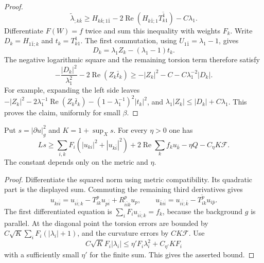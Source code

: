 \begin{proof}
\[
 \widetilde\lambda_{;k\bar k}\geq
 H_{k\bar k;1\bar1}
 -2\operatorname{Re}(H_{k\bar1;1}\overline{T^1_{k1}})-C\lambda_1.
\]
Differentiate $F(W)=f$ twice and sum this inequality with weights $F_k$. Write $D_k=H_{1\bar1;k}$ and $t_k=T^1_{k1}$. The first commutation, using $U_{1\bar1}=\lambda_1-1$, gives
\[
 D_k=\lambda_1Z_k-(\lambda_1-1)t_k.
\]
The negative logarithmic square and the remaining torsion term therefore satisfy
\[
 -\frac{|D_k|^2}{\lambda_1^2}-2\operatorname{Re}(Z_k\bar t_k)
 \geq-|Z_k|^2-C-C\lambda_1^{-2}|D_k|.
\]
For example, expanding the left side leaves $-|Z_k|^2-2\lambda_1^{-1}\operatorname{Re}(Z_k\bar t_k)-(1-\lambda_1^{-1})^2|t_k|^2$, and $\lambda_1|Z_k|\leq|D_k|+C\lambda_1$. This proves the claim, uniformly for small $\beta$.
\end{proof}

\begin{lemma}\label{draft:600-hermitian-gradient-commutation}
Put $s=|\partial u|_g^2$ and $K=1+\sup_Xs$. For every $\eta>0$ one has
\[
 Ls\geq\sum_{i,k}F_i(|u_{ki}|^2+|u_{k\bar i}|^2)
 +2\operatorname{Re}\sum_k f_k u_{\bar k}-\eta Q-C_\eta K\mathcal F.
\]
The constant depends only on the metric and $\eta$.
\end{lemma}
\begin{proof}
Differentiate the squared norm using metric compatibility. Its quadratic part is the displayed sum. Commuting the remaining third derivatives gives
\[
 u_{ki\bar i}=u_{i\bar i;k}-T^p_{ik}u_{p\bar i}
                  +R^p_{i\bar i k}u_p,
 \qquad
 u_{\bar k i\bar i}=u_{i\bar i;\bar k}
                  -\overline{T^p_{ik}}u_{i\bar p}.
\]
The first differentiated equation is $\sum_iF_i u_{i\bar i;k}=f_k$, because the background $g$ is parallel. At the diagonal point the torsion errors are bounded by $C\sqrt K\sum_iF_i(|\lambda_i|+1)$, and the curvature errors by $CK\mathcal F$. Use
\[
 C\sqrt K F_i|\lambda_i|
       \leq\eta' F_i\lambda_i^2+C_{\eta'}KF_i
\]
with a sufficiently small $\eta'$ for the finite sum. This gives the asserted bound.
\end{proof}

